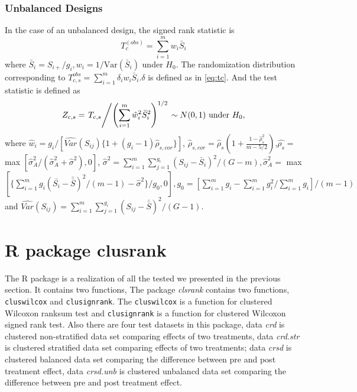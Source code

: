\documentclass[12pt]{article}
\begin{document}
\subsubsection{Unbalanced Designs}
In the case of an unbalanced design, the signed rank statistic is 
\begin{equation}
T_c^{(obs)} = \sum_{i = 1}^m w_i\bar{S}_i  
\end{equation}
where $\bar{S}_i = S_{i+}/{g_i}, w_i = 1/\text{Var}(\bar{S}_i)$ under $H_0$. 
The randomization distribution corresponding to $T_{c,s}^{obs} = \sum^m_{i=1}\delta_iw_i\bar{S}_i$.$\delta$ is defined as in \eqref{eq:tc}.
And the test statistic is defined as 
\begin{equation}
Z_{c,s} = \left.T_{c,s}\middle/ \left(\sum_{i=1}^m\hat{w}^2_i\bar{S}^2_i\right)^{1/2}\right. \sim N(0,1) \text{ under }H_0,
\end{equation}
where $\hat{w}_i = g_i/[\widehat{Var}(S_{ij})\{1 + (g_i-1)\hat{\rho}_{s,cor}\}]$, $\hat{\rho}_{s,cor} = \hat{\rho}_s\left(1 + \frac{1 - \hat{\rho}_s^2}{m - 5/2}\right)$,$\hat{\rho_s} = $ max $[\hat{\sigma}_A^2/(\hat{\sigma}_A^2 + \hat{\sigma}^2), 0]$, $\hat{\sigma
}^2 = \sum_{i=1}^m\sum_{j=1}^{g_i}(S_{ij} - \bar{S}_i)^2/(G-m), \hat{\sigma}^2_A = $ max $[\{\sum_{i=1}^mg_i(\bar{S_i}- \bar{\bar{S}})^2/(m-1)- \hat{\sigma}^2\}/g_0,0], g_0 = [\sum_{i=1}^mg_i - \sum_{i=1}^mg_i^2/\sum_{i=1}^mg_i]/(m-1)$ and $\widehat{Var}(S_{ij}) = \sum_{i=1}^m\sum_{j=1}^{g_i}(S_{ij} - \bar{\bar{S}})^2/(G-1)$.

\section{R package clusrank}
The R package is a realization of all the tested we presented in the previous section. It contains two functions, 
The package \emph{clsrank} contains two functions, \texttt{cluswilcox}
and \texttt{clusignrank}. The \texttt{cluswilcox} is a function for
clustered Wilcoxon ranksum test and \texttt{clusignrank} is a function
for clustered Wilcoxon signed rank test. Also there are four test
datasets in this package, data \emph{crd} is clustered non-stratified
data set comparing effects of two treatments, data \emph{crd.str} is
clustered stratified data set comparing effects of two treatments; data
\emph{crsd} is clustered balanced data set comparing the difference
between pre and post treatment effect, data \emph{crsd.unb} is clustered
unbalancd data set comparing the difference between pre and post
treatment effect.
\end{document}

